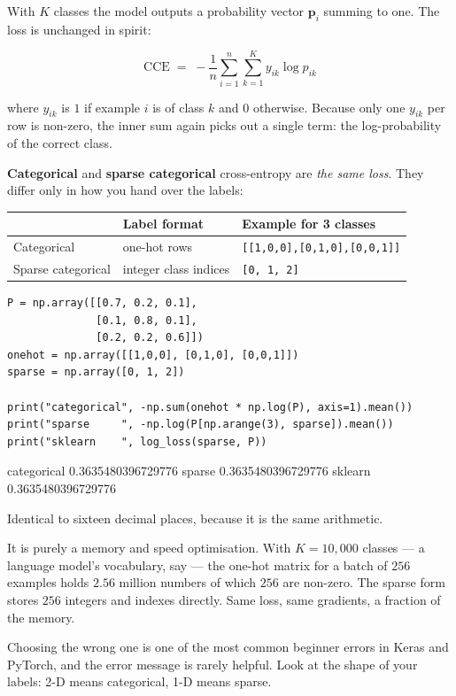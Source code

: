 \documentclass[11pt]{article}
\begin{document}
With $K$ classes the model outputs a probability vector $\mathbf{p}_i$ summing
to one. The loss is unchanged in spirit:

\[
  \mathrm{CCE} \;=\; -\frac{1}{n}\sum_{i=1}^{n}\sum_{k=1}^{K}
     y_{ik} \log p_{ik}
\]

where $y_{ik}$ is $1$ if example $i$ is of class $k$ and $0$ otherwise. Because
only one $y_{ik}$ per row is non-zero, the inner sum again picks out a single
term: the log-probability of the correct class.

\textbf{Categorical} and \textbf{sparse categorical} cross-entropy are
\emph{the same loss}. They differ only in how you hand over the labels:

\begin{center}
\begin{tabular}{@{}lll@{}}
\toprule
& \textbf{Label format} & \textbf{Example for 3 classes}\\
\midrule
Categorical        & one-hot rows          & \texttt{[[1,0,0],[0,1,0],[0,0,1]]}\\
Sparse categorical & integer class indices & \texttt{[0, 1, 2]}\\
\bottomrule
\end{tabular}
\end{center}

\begin{lstlisting}
P = np.array([[0.7, 0.2, 0.1],
              [0.1, 0.8, 0.1],
              [0.2, 0.2, 0.6]])
onehot = np.array([[1,0,0], [0,1,0], [0,0,1]])
sparse = np.array([0, 1, 2])

print("categorical", -np.sum(onehot * np.log(P), axis=1).mean())
print("sparse     ", -np.log(P[np.arange(3), sparse]).mean())
print("sklearn    ", log_loss(sparse, P))
\end{lstlisting}
\begin{codeout}
categorical 0.3635480396729776
sparse      0.3635480396729776
sklearn     0.3635480396729776
\end{codeout}

Identical to sixteen decimal places, because it is the same arithmetic.

\begin{caution}
It is purely a memory and speed optimisation. With $K = 10{,}000$ classes --- a
language model's vocabulary, say --- the one-hot matrix for a batch of $256$
examples holds $2.56$ million numbers of which $256$ are non-zero. The sparse
form stores $256$ integers and indexes directly. Same loss, same gradients, a
fraction of the memory.

Choosing the wrong one is one of the most common beginner errors in Keras and
PyTorch, and the error message is rarely helpful. Look at the shape of your
labels: 2-D means categorical, 1-D means sparse.
\end{caution}
\end{document}
